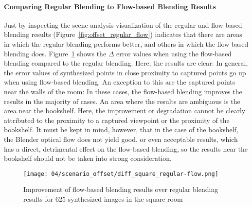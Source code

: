 \paragraph{Comparing Regular Blending to Flow-based Blending Results}
Just by inspecting the scene analysis visualization of the regular and flow-based blending results (Figure~\ref{fig:offset_regular_flow}) indicates that there are areas in which the regular blending performs better, and others in which the flow based blending does. Figure~\ref{fig:scenario_offset_diff} shows the $\Delta$ error values when using the flow-based blending compared to the regular blending. Here, the results are clear: In general, the error values of synthesized points in close proximity to captured points go up when using flow-based blending. An exception to this are the captured points near the walls of the room: In these cases, the flow-based blending improves the results in the majority of cases. An area where the results are ambiguous is the area near the bookshelf. Here, the improvement or degradation cannot be clearly attributed to the proximity to a captured viewpoint or the proximity of the bookshelf. It must be kept in mind, however, that in the case of the bookshelf, the Blender optical flow does not yield good, or even acceptable results, which has a direct, detrimental effect on the flow-based blending, so the results near the bookshelf should not be taken into strong consideration.





\begin{figure}
		\centering
		\texttt{[image: 04/scenario\_offset/diff\_square\_regular-flow.png]}
		\caption{Improvement of flow-based blending results over regular blending results for 625 synthesized images in the square room}
		\label{fig:scenario_offset_diff}
\end{figure}

